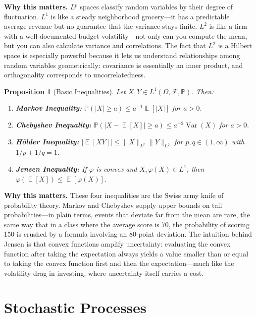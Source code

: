 \documentclass[11pt,a4paper,openany]{book}
\theoremstyle{definition}
\theoremstyle{plain}
\newtheorem{proposition}[theorem]{Proposition}
\theoremstyle{remark}
\DeclareMathOperator{\E}{\mathbb{E}}
\DeclareMathOperator{\Var}{Var}
\newcommand{\1}{\mathbbm{1}}
\newcommand{\F}{\mathcal{F}}
\newcommand{\Pbb}{\mathbb{P}}
\begin{document}
\medskip
\noindent\textbf{Why this matters.} $L^{p}$ spaces classify random variables by their degree of fluctuation. $L^{1}$ is like a steady neighborhood grocery---it has a predictable average revenue but no guarantee that the variance stays finite. $L^{2}$ is like a firm with a well-documented budget volatility---not only can you compute the mean, but you can also calculate variance and correlations. The fact that $L^{2}$ is a Hilbert space is especially powerful because it lets us understand relationships among random variables geometrically: covariance is essentially an inner product, and orthogonality corresponds to uncorrelatedness.

\begin{proposition}[Basic Inequalities]
Let $X, Y \in L^{1}(\Omega, \F, \Pbb)$. Then:
\begin{enumerate}[label=(\arabic*)]
    \item \textbf{Markov Inequality:} $\Pbb(|X| \geq a) \leq a^{-1} \E[|X|]$ for $a > 0$.
    \item \textbf{Chebyshev Inequality:} $\Pbb(|X - \E[X]| \geq a) \leq a^{-2} \Var(X)$ for $a > 0$.
    \item \textbf{H\"{o}lder Inequality:} $|\E[XY]| \leq \|X\|_{L^{p}} \|Y\|_{L^{q}}$ for $p, q \in (1, \infty)$ with $1/p + 1/q = 1$.
    \item \textbf{Jensen Inequality:} If $\varphi$ is convex and $X, \varphi(X) \in L^{1}$, then $\varphi(\E[X]) \leq \E[\varphi(X)]$.
\end{enumerate}
\end{proposition}

\medskip
\noindent\textbf{Why this matters.} These four inequalities are the Swiss army knife of probability theory. Markov and Chebyshev supply upper bounds on tail probabilities---in plain terms, events that deviate far from the mean are rare, the same way that in a class where the average score is 70, the probability of scoring 150 is crushed by a formula involving an 80-point deviation. The intuition behind Jensen is that convex functions amplify uncertainty: evaluating the convex function after taking the expectation always yields a value smaller than or equal to taking the convex function first and then the expectation---much like the volatility drag in investing, where uncertainty itself carries a cost.

\section{Stochastic Processes}
\end{document}
